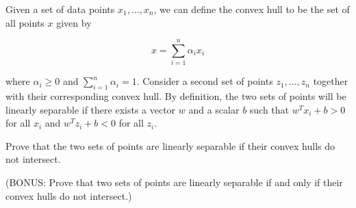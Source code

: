 \begin{problem}
Given a set of data points $x_1,\ldots,x_n$, we can define the convex hull to be the set of all points $x$ given by

\[x = \sum_{i=1}^{n} \alpha_i x_i \]

\noindent
where $\alpha_{i} \geq 0$ and $\sum_{i=1}^{n} \alpha_i = 1$. Consider a second set of points $z_1,\ldots,z_n$ together with their corresponding convex hull. By definition, the two sets of points will be linearly separable if there exists a vector $w$ and a scalar $b$ such that $w^{T}x_i + b > 0$ for all $x_i$ and $w^{T}z_i + b < 0$ for all $z_i$.

Prove that the two sets of points are linearly separable if their convex hulls do not intersect.
\end{problem}

\begin{subproblem}
  (BONUS: Prove that two sets of points are linearly separable if and only if their convex hulls do not intersect.)
\end{subproblem}

